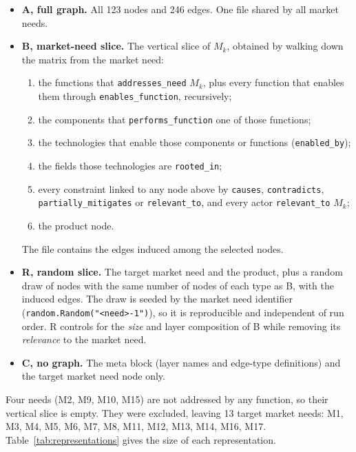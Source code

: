 \begin{itemize}
\tightlist
\item
  \textbf{A, full graph.} All 123 nodes and 246 edges. One file shared by all market needs.
\item
  \textbf{B, market-need slice.} The vertical slice of \(M_k\), obtained by walking down the matrix from the market need:

  \begin{enumerate}
  \def\labelenumi{\arabic{enumi}.}
  \tightlist
  \item
    the functions that \texttt{addresses\_need} \(M_k\), plus every function that enables them through \texttt{enables\_function}, recursively;
  \item
    the components that \texttt{performs\_function} one of those functions;
  \item
    the technologies that enable those components or functions (\texttt{enabled\_by});
  \item
    the fields those technologies are \texttt{rooted\_in};
  \item
    every constraint linked to any node above by \texttt{causes}, \texttt{contradicts}, \texttt{partially\_mitigates} or \texttt{relevant\_to}, and every actor \texttt{relevant\_to} \(M_k\);
  \item
    the product node.
  \end{enumerate}

  The file contains the edges induced among the selected nodes.
\item
  \textbf{R, random slice.} The target market need and the product, plus a random draw of nodes with the same number of nodes of each type as B, with the induced edges. The draw is seeded by the market need identifier (\texttt{random.Random("\textless{}need\textgreater{}-1")}), so it is reproducible and independent of run order. R controls for the \emph{size} and layer composition of B while removing its \emph{relevance} to the market need.
\item
  \textbf{C, no graph.} The meta block (layer names and edge-type definitions) and the target market need node only.
\end{itemize}

Four needs (M2, M9, M10, M15) are not addressed by any function, so their vertical slice is empty. They were excluded, leaving 13 target market needs: M1, M3, M4, M5, M6, M7, M8, M11, M12, M13, M14, M16, M17. Table~\ref{tab:representations} gives the size of each representation.

